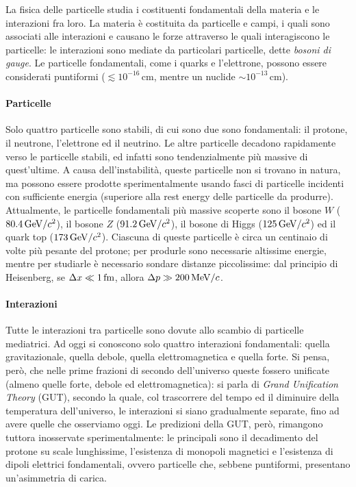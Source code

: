 
La fisica delle particelle studia i costituenti fondamentali della materia e le interazioni fra loro. La materia è costituita da particelle e campi, i quali sono associati alle interazioni e causano le forze attraverso le quali interagiscono le particelle: le interazioni sono mediate da particolari particelle, dette \textit{bosoni di gauge}. Le particelle fondamentali, come i quarks e l'elettrone, possono essere considerati puntiformi ($ \lesssim 10^{-16}\,\text{cm} $, mentre un nuclide $ \sim 10^{-13}\,\text{cm} $).

\paragraph{Particelle}

Solo quattro particelle sono stabili, di cui sono due sono fondamentali: il protone, il neutrone, l'elettrone ed il neutrino. Le altre particelle decadono rapidamente verso le particelle stabili, ed infatti sono tendenzialmente più massive di quest'ultime. A causa dell'instabilità, queste particelle non si trovano in natura, ma possono essere prodotte sperimentalmente usando fasci di particelle incidenti con sufficiente energia (superiore alla rest energy delle particelle da produrre).\\
Attualmente, le particelle fondamentali più massive scoperte sono il bosone $ W $ ($ 80.4\,\mathrm{GeV}/c^2 $), il bosone $ Z $ ($ 91.2\,\mathrm{GeV}/c^2 $), il bosone di Higgs ($ 125\,\mathrm{GeV}/c^2 $) ed il quark top ($ 173\,\mathrm{GeV}/c^2 $). Ciascuna di queste particelle è circa un centinaio di volte più pesante del protone; per produrle sono necessarie altissime energie, mentre per studiarle è necessario sondare distanze piccolissime: dal principio di Heisenberg, se $ \Delta x \ll 1\,\mathrm{fm} $, allora $ \Delta p \gg 200\,\mathrm{MeV}/c $.

\paragraph{Interazioni}

Tutte le interazioni tra particelle sono dovute allo scambio di particelle mediatrici. Ad oggi si conoscono solo quattro interazioni fondamentali: quella gravitazionale, quella debole, quella elettromagnetica e quella forte. Si pensa, però, che nelle prime frazioni di secondo dell'universo queste fossero unificate (almeno quelle forte, debole ed elettromagnetica): si parla di \textit{Grand Unification Theory} (GUT), secondo la quale, col trascorrere del tempo ed il diminuire della temperatura dell'universo, le interazioni si siano gradualmente separate, fino ad avere quelle che osserviamo oggi. Le predizioni della GUT, però, rimangono tuttora inosservate sperimentalmente: le principali sono il decadimento del protone su scale lunghissime, l'esistenza di monopoli magnetici e l'esistenza di dipoli elettrici fondamentali, ovvero particelle che, sebbene puntiformi, presentano un'asimmetria di carica.

